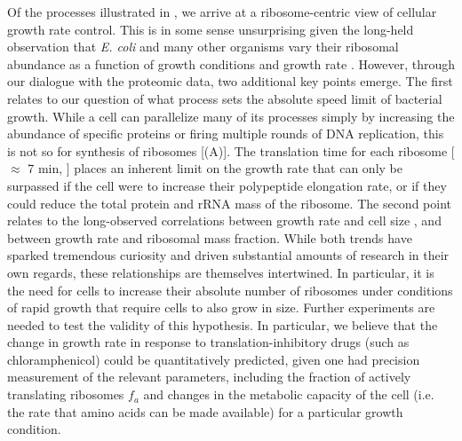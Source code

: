 Of the processes illustrated in , we arrive at a
ribosome-centric view of cellular growth rate control. This is in some sense
unsurprising given the long-held observation that \textit{E. coli} and many
other organisms vary their ribosomal abundance as a function of growth
conditions and growth rate \citep{scott2010, metzlraz2017}. However, through our
dialogue with the proteomic data, two additional key points emerge. The first
relates to our question of what process sets the absolute speed limit of
bacterial growth. While a cell can parallelize many of its processes simply by
increasing the abundance of specific proteins or firing multiple rounds of DNA
replication, this is not so for synthesis of ribosomes
[(A)]. The translation time for each ribosome [$\approx$ 7
min, \cite{dill2011}] places an inherent limit on the growth rate that can only
be surpassed if the cell were to increase their polypeptide elongation rate, or
if they could reduce the total protein and rRNA mass of the ribosome. The second
point relates to the long-observed correlations between growth rate and cell
size \citep{schaechter1958, si2017}, and between growth rate and ribosomal mass
fraction. While both trends have sparked tremendous curiosity and driven
substantial amounts of research in their own regards, these relationships are
themselves intertwined. In particular, it is the need for cells to increase
their absolute number of ribosomes under conditions of rapid growth that require
cells to also grow in size. Further experiments are needed to test the validity
of this hypothesis. In particular, we believe that the change in growth rate in
response to translation-inhibitory drugs (such as chloramphenicol) could be
quantitatively predicted, given one had precision measurement of the relevant
parameters, including the fraction of actively translating ribosomes $f_a$ and
changes in the metabolic capacity of the cell (i.e. the rate that amino acids can be made
available) for a particular growth condition.

